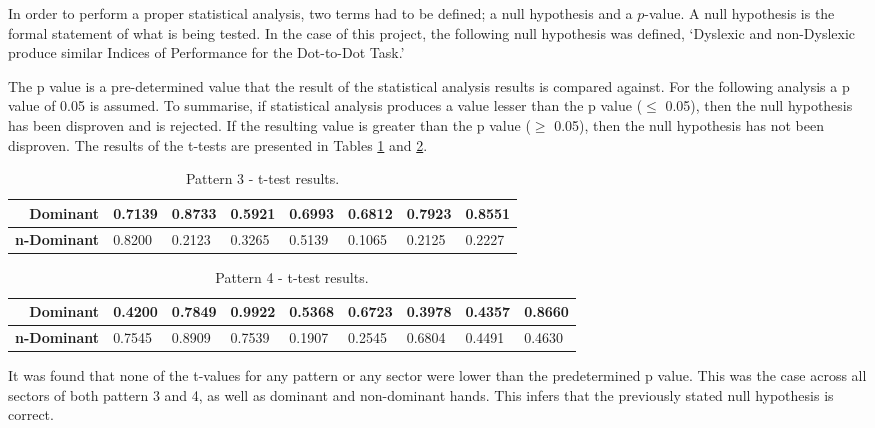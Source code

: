		In order to perform a proper statistical analysis, two terms had to be defined; a null hypothesis and a \(p\)-value. A null hypothesis is the formal statement of what is being tested. In the case of this project, the following null hypothesis was defined,
		‘Dyslexic and non-Dyslexic produce similar Indices of Performance for the Dot-to-Dot Task.’
		
		The p value is a pre-determined value that the result of the statistical analysis results is compared against. For the following analysis a p value of 0.05 is assumed. To summarise, if statistical analysis produces a value lesser than the p value ($\leq$ 0.05), then the null hypothesis has been disproven and is rejected. If the resulting value is greater than the p value ($\geq$ 0.05), then the null hypothesis has not been disproven. The results of the t-tests are presented in Tables \ref{tab_pat_3_t} and \ref{tab_pat_4_t}.

		\begin{table}[h]
			\centering
			\caption{Pattern 3 - t-test results.}
			\label{tab_pat_3_t}
			\begin{tabularx}{\textwidth}{|r|X|X|X|X|X|X|X|}
				\hline
				\textbf{Dominant}   & 0.7139 & 0.8733 & 0.5921 & 0.6993 & 0.6812 & 0.7923 & 0.8551 \\ \hline
				\textbf{n-Dominant} & 0.8200 & 0.2123 & 0.3265 & 0.5139 & 0.1065 & 0.2125 & 0.2227 \\ \hline
			\end{tabularx}
		\end{table}
	
		\begin{table}[h]
			\centering
			\caption{Pattern 4 - t-test results.}
			\label{tab_pat_4_t}
			\begin{tabularx}{\textwidth}{|r|X|X|X|X|X|X|X|X|}
				\hline
				\textbf{Dominant}   & 0.4200 & 0.7849 & 0.9922 & 0.5368 & 0.6723 & 0.3978 & 0.4357 & 0.8660 \\ \hline
				\textbf{n-Dominant} & 0.7545 & 0.8909 & 0.7539 & 0.1907 & 0.2545 & 0.6804 & 0.4491 & 0.4630 \\ \hline
			\end{tabularx}
		\end{table}
		
		It was found that none of the t-values for any pattern or any sector were lower than the predetermined p value. This was the case across all sectors of both pattern 3 and 4, as well as dominant and non-dominant hands. This infers that the previously stated null hypothesis is correct. 

